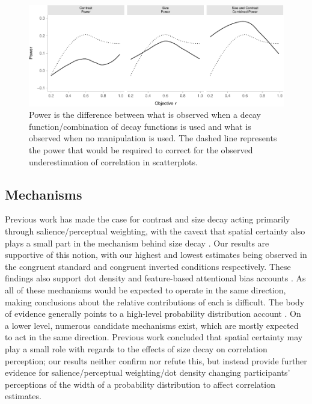 \documentclass[manuscript, review, anonymous, screen]{acmart}
\begin{document}
\begin{figure}

{\centering \includegraphics[width=1\textwidth,height=\textheight]{size_and_contrast_files/figure-pdf/fig-power-plot-1.pdf}

}

\caption{\label{fig-power-plot}Power is the difference between what is
observed when a decay function/combination of decay functions is used
and what is observed when no manipulation is used. The dashed line
represents the power that would be required to correct for the observed
underestimation of correlation in scatterplots.}
\end{figure}

\hypertarget{sec-mechs}{%
\subsection{Mechanisms}\label{sec-mechs}}

Previous work has made the case for contrast and size decay acting
primarily through salience/perceptual weighting, with the caveat that
spatial certainty also plays a small part in the mechanism behind size
decay \citep{strain_2023, strain_2023b}. Our results are supportive of
this notion, with our highest and lowest estimates being observed in the
congruent standard and congruent inverted conditions respectively. These findings also
support dot density \citep{yang_2023} and feature-based attentional bias
accounts \citep{hong_2021, sun_2016}. As all of these mechanisms would
be expected to operate in the same direction, making conclusions about
the relative contributions of each is difficult. The body of evidence
generally points to a high-level probability distribution account
\citep{rensink_2017, rensink_2022}. On a lower level, numerous candidate
mechanisms exist, which are mostly expected to act in the same
direction. Previous work concluded that spatial certainty
\citep{strain_2023b} may play a small role with regards to the effects
of size decay on correlation perception; our results neither confirm nor
refute this, but instead provide further evidence for
salience/perceptual weighting/dot density changing participants'
perceptions of the width of a probability distribution to affect
correlation estimates.
\end{document}
